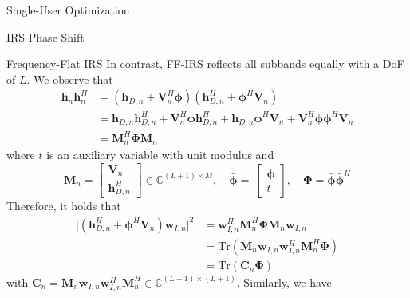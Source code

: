 \documentclass{IEEEtran}
\begin{document}
\begin{section}{Single-User Optimization}
\begin{subsection}{IRS Phase Shift}
		\begin{subsubsection}{Frequency-Flat IRS}
			In contrast, FF-IRS reflects all subbands equally with a DoF of $L$. We observe that
			\begin{equation}\label{eq:h_n_outer_product}
				\begin{split}
					\boldsymbol{h}_n\boldsymbol{h}_n^H
					&=(\boldsymbol{h}_{D,n}+\boldsymbol{V}_n^H\boldsymbol{\phi})(\boldsymbol{h}_{D,n}^H+\boldsymbol{\phi}^H\boldsymbol{V}_n)\\
					&=\boldsymbol{h}_{D,n}\boldsymbol{h}_{D,n}^H+\boldsymbol{V}_n^H\boldsymbol{\phi}\boldsymbol{h}_{D,n}^H+\boldsymbol{h}_{D,n}\boldsymbol{\phi}^H\boldsymbol{V}_n+\boldsymbol{V}_n^H\boldsymbol{\phi}\boldsymbol{\phi}^H\boldsymbol{V}_n\\
					&=\boldsymbol{M}_n^H\boldsymbol{\Phi}\boldsymbol{M}_n
				\end{split}
			\end{equation}
			where $t$ is an auxiliary variable with unit modulus and
			\begin{equation}\label{eq:M_n,phi}
				\boldsymbol{M}_n=
				\begin{bmatrix}
					\boldsymbol{V}_n \\
					\boldsymbol{h}_{D,n}^H
				\end{bmatrix} \in \mathbb{C}^{(L+1) \times M},
				\quad \bar{\boldsymbol{\phi}}=\
				\begin{bmatrix}
					\boldsymbol{\phi} \\
					t
				\end{bmatrix},
				\quad \boldsymbol{\Phi}=\bar{\boldsymbol{\phi}}\bar{\boldsymbol{\phi}}^H
			\end{equation}
			Therefore, it holds that
			\begin{equation}
				\begin{split}
					\lvert(\boldsymbol{h}_{D,n}^H+\boldsymbol{\phi}^H\boldsymbol{V}_n)\boldsymbol{w}_{I,n}\rvert^2
					&=\boldsymbol{w}_{I,n}^H\boldsymbol{M}_n^H\boldsymbol{\Phi}\boldsymbol{M}_n\boldsymbol{w}_{I,n}\\
					&=\mathrm{Tr}(\boldsymbol{M}_n\boldsymbol{w}_{I,n}\boldsymbol{w}_{I,n}^H\boldsymbol{M}_n^H\boldsymbol{\Phi})\\
					&=\mathrm{Tr}(\boldsymbol{C}_n\boldsymbol{\Phi})
				\end{split}
			\end{equation}
			with $\boldsymbol{C}_n = \boldsymbol{M}_n\boldsymbol{w}_{I,n}\boldsymbol{w}_{I,n}^H\boldsymbol{M}_n^H \in \mathbb{C}^{(L+1)\times(L+1)}$. Similarly, we have

\end{subsubsection}
\end{subsection}
\end{section}
\end{document}
